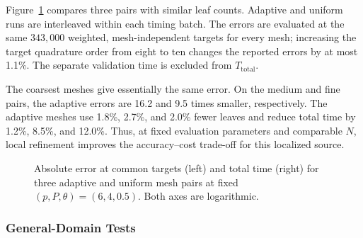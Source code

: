 \documentclass[a4paper,pdflatex,sn-mathphys-num]{sn-jnl}
\theoremstyle{thmstyleone}
\begin{document}
Figure~\ref{fig:adaptive_uniform} compares three pairs with similar leaf counts. Adaptive and uniform runs are interleaved within each timing batch. The errors are evaluated at the same $343{,}000$ weighted, mesh-independent targets for every mesh; increasing the target quadrature order from eight to ten changes the reported errors by at most 1.1\%. The separate validation time is excluded from $T_{\mathrm{total}}$.

The coarsest meshes give essentially the same error. On the medium and fine pairs, the adaptive errors are 16.2 and 9.5 times smaller, respectively. The adaptive meshes use 1.8\%, 2.7\%, and 2.0\% fewer leaves and reduce total time by 1.2\%, 8.5\%, and 12.0\%. Thus, at fixed evaluation parameters and comparable $N$, local refinement improves the accuracy--cost trade-off for this localized source.

\begin{figure}[!htbp]
\centering
{}
\caption{Absolute error at common targets (left) and total time (right) for
three adaptive and uniform mesh pairs at fixed $(p,P,\theta)=(6,4,0.5)$.
Both axes are logarithmic.}
\label{fig:adaptive_uniform}
\end{figure}

\FloatBarrier

\subsubsection{General-Domain Tests}
\label{sec:general_domain_test}
\end{document}
